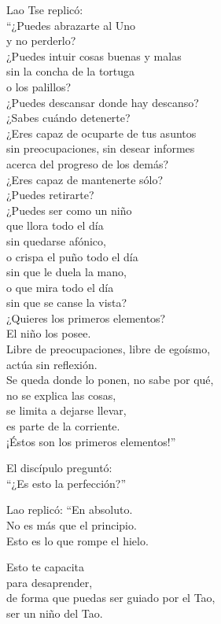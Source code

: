 \documentclass[hidelinks]{memoir}
\begin{document}
	Lao Tse replicó:\\
	``¿Puedes abrazarte al Uno\\
	y no perderlo?\\
	¿Puedes intuir cosas buenas y malas\\
	sin la concha de la tortuga\\
	o los palillos?\\
	¿Puedes descansar donde hay descanso?\\
	¿Sabes cuándo detenerte?\\
	¿Eres capaz de ocuparte de tus asuntos\\
	sin preocupaciones, sin desear informes\\
	acerca del progreso de los demás?\\
	¿Eres capaz de mantenerte sólo?\\
	¿Puedes retirarte?\\
	¿Puedes ser como un niño\\
	que llora todo el día\\
	sin quedarse afónico,\\
	o crispa el puño todo el día\\
	sin que le duela la mano,\\
	o que mira todo el día\\
	sin que se canse la vista?\\
	¿Quieres los primeros elementos?\\
	El niño los posee.\\
	Libre de preocupaciones, libre de egoísmo,\\
	actúa sin reflexión.\\
	Se queda donde lo ponen, no sabe por qué,\\
	no se explica las cosas,\\
	se limita a dejarse llevar,\\
	es parte de la corriente.\\
	¡Éstos son los primeros elementos!''
	
	El discípulo preguntó:\\
	``¿Es esto la perfección?''
	
	Lao replicó: ``En absoluto.\\
	No es más que el principio.\\
	Esto es lo que rompe el hielo.
	
	Esto te capacita\\
	para desaprender,\\
	de forma que puedas ser guiado por el Tao,\\
	ser un niño del Tao.
	
\end{document}
